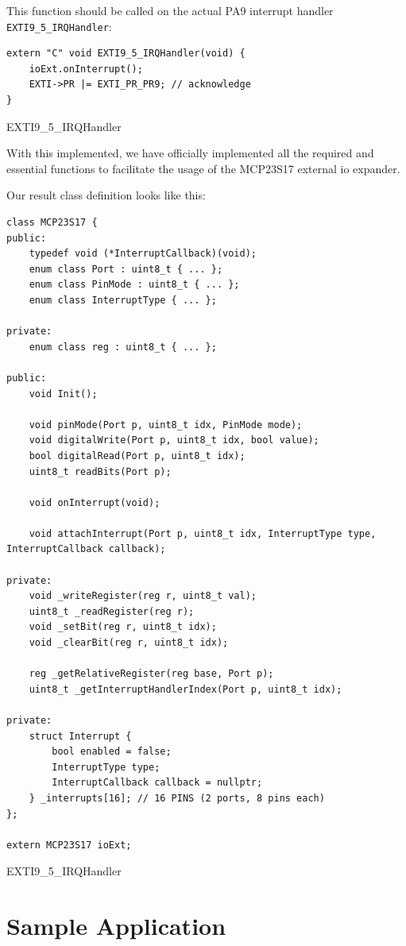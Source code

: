 \documentclass{article}
\begin{document}
This function should be called on the actual PA9 interrupt handler \verb|EXTI9_5_IRQHandler|: 


\begin{listing}[H]
\begin{verbatim}
extern "C" void EXTI9_5_IRQHandler(void) {
    ioExt.onInterrupt();
    EXTI->PR |= EXTI_PR_PR9; // acknowledge
}
\end{verbatim}
\caption{EXTI9\_5\_IRQHandler}
\end{listing}

With this implemented, we have officially implemented all the required and essential functions to facilitate the usage of the MCP23S17 external io expander.

Our result class definition looks like this:
\begin{listing}[H]
\begin{verbatim}
class MCP23S17 {
public:
    typedef void (*InterruptCallback)(void);
    enum class Port : uint8_t { ... };
    enum class PinMode : uint8_t { ... };
    enum class InterruptType { ... };

private:
    enum class reg : uint8_t { ... };

public:
    void Init();

    void pinMode(Port p, uint8_t idx, PinMode mode);
    void digitalWrite(Port p, uint8_t idx, bool value);
    bool digitalRead(Port p, uint8_t idx);
    uint8_t readBits(Port p);

    void onInterrupt(void);

    void attachInterrupt(Port p, uint8_t idx, InterruptType type, InterruptCallback callback);

private:
    void _writeRegister(reg r, uint8_t val);
    uint8_t _readRegister(reg r);
    void _setBit(reg r, uint8_t idx);
    void _clearBit(reg r, uint8_t idx);

    reg _getRelativeRegister(reg base, Port p);
    uint8_t _getInterruptHandlerIndex(Port p, uint8_t idx);
    
private:
    struct Interrupt {
        bool enabled = false;
        InterruptType type;
        InterruptCallback callback = nullptr;
    } _interrupts[16]; // 16 PINS (2 ports, 8 pins each)
};

extern MCP23S17 ioExt;
\end{verbatim}
\caption{EXTI9\_5\_IRQHandler}
\end{listing}


\section{Sample Application}
\end{document}
